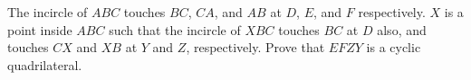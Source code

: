 The incircle of $ABC$ touches $BC$, $CA$, and $AB$ at $D$, $E$, and $F$ respectively. $X$ is a point inside $ABC$ such that the incircle of $XBC$ touches $BC$ at $D$ also, and touches $CX$ and $XB$ at $Y$ and $Z$, respectively. Prove that $EFZY$ is a cyclic quadrilateral.
